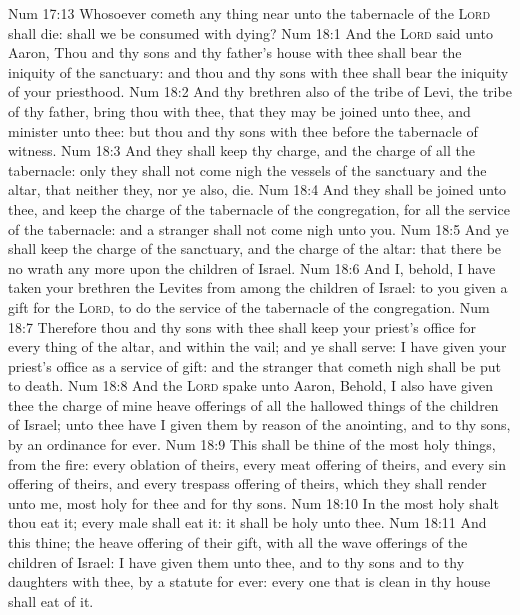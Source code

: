 \vs Num 17:13 Whosoever cometh any thing near unto the tabernacle of the \textsc{Lord} shall die: shall we be consumed with dying?
\vs Num 18:1 And the \textsc{Lord} said unto Aaron, Thou and thy sons and thy father's house with thee shall bear the iniquity of the sanctuary: and thou and thy sons with thee shall bear the iniquity of your priesthood.
\vs Num 18:2 And thy brethren also of the tribe of Levi, the tribe of thy father, bring thou with thee, that they may be joined unto thee, and minister unto thee: but thou and thy sons with thee  before the tabernacle of witness.
\vs Num 18:3 And they shall keep thy charge, and the charge of all the tabernacle: only they shall not come nigh the vessels of the sanctuary and the altar, that neither they, nor ye also, die.
\vs Num 18:4 And they shall be joined unto thee, and keep the charge of the tabernacle of the congregation, for all the service of the tabernacle: and a stranger shall not come nigh unto you.
\vs Num 18:5 And ye shall keep the charge of the sanctuary, and the charge of the altar: that there be no wrath any more upon the children of Israel.
\vs Num 18:6 And I, behold, I have taken your brethren the Levites from among the children of Israel: to you  given  a gift for the \textsc{Lord}, to do the service of the tabernacle of the congregation.
\vs Num 18:7 Therefore thou and thy sons with thee shall keep your priest's office for every thing of the altar, and within the vail; and ye shall serve: I have given your priest's office  as a service of gift: and the stranger that cometh nigh shall be put to death.
\vs Num 18:8 And the \textsc{Lord} spake unto Aaron, Behold, I also have given thee the charge of mine heave offerings of all the hallowed things of the children of Israel; unto thee have I given them by reason of the anointing, and to thy sons, by an ordinance for ever.
\vs Num 18:9 This shall be thine of the most holy things,  from the fire: every oblation of theirs, every meat offering of theirs, and every sin offering of theirs, and every trespass offering of theirs, which they shall render unto me,  most holy for thee and for thy sons.
\vs Num 18:10 In the most holy  shalt thou eat it; every male shall eat it: it shall be holy unto thee.
\vs Num 18:11 And this  thine; the heave offering of their gift, with all the wave offerings of the children of Israel: I have given them unto thee, and to thy sons and to thy daughters with thee, by a statute for ever: every one that is clean in thy house shall eat of it.
